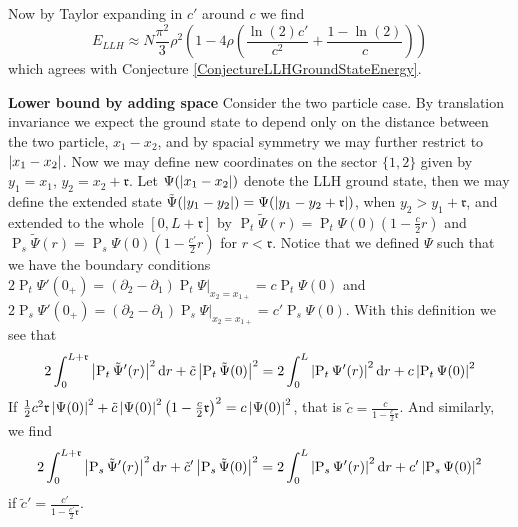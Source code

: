 Now by Taylor expanding in $ c' $ around $ c $ we find 
\begin{equation}
	E_{LLH}\approx N\frac{\pi^2}{3}\rho^2\left(1-4\rho\left(\frac{\ln(2)c'}{c^2}+\frac{1-\ln(2)}{c}\right)\right)
\end{equation}
which agrees with Conjecture \ref{ConjectureLLHGroundStateEnergy}.

\textbf{Lower bound by adding space}
Consider the two particle case. By translation invariance we expect the ground state to depend only on the distance between the two particle, $ x_1-x_2 $, and by spacial symmetry we may further restrict to $ \left\lvert x_1-x_2 \right\rvert $. Now we may define new coordinates on the sector $ \{1,2\} $ given by $ y_1=x_1 $, $ y_2=x_2+\mathfrak{r} $. Let $ \Psi(\left\lvert x_1-x_2 \right\rvert) $ denote the LLH ground state, then we may define the extended state $ \tilde{\Psi}(\left\lvert y_1-y_2 \right\rvert)=\Psi(\left\lvert y_1-y_2+\mathfrak{r} \right\rvert) $, when $ y_2>y_1+\mathfrak{r} $, and extended to the whole $ [0,L+\mathfrak{r}] $ by $ \operatorname{P}_t\tilde{\Psi}(r)=\operatorname{P}_t\Psi(0)\left(1-\frac{c}{2}r\right) $ and $ \operatorname{P}_s\tilde{\Psi}(r)=\operatorname{P}_s\Psi(0)\left(1-\frac{c'}{2}r\right) $ for $ r<\mathfrak{r} $. Notice that we defined $ \Psi $ such that we have the boundary conditions $ 2\operatorname{P}_t\Psi'(0_+)=(\partial_2-\partial_1)\operatorname{P}_t\Psi\vert_{x_2=x_{1+}}=c\operatorname{P}_t\Psi(0) $ and $ 2\operatorname{P}_s\Psi'(0_+)=(\partial_2-\partial_1)\operatorname{P}_s\Psi\vert_{x_2=x_{1+}}=c'\operatorname{P}_s\Psi(0) $. With this definition we see that \begin{equation}
2\int_{0}^{L+\mathfrak{r}}\left\lvert \operatorname{P}_{t}\tilde{\Psi}'(r) \right\rvert^2\mathop{}\!\mathrm{d} r+\tilde{c}\left\lvert \operatorname{P}_{t}\tilde{\Psi}(0) \right\rvert^2=2\int_{0}^{L}\left\lvert \operatorname{P}_{t}\Psi'(r) \right\rvert^2\mathop{}\!\mathrm{d} r+c\left\lvert \operatorname{P}_{t}\Psi(0) \right\rvert^2
\end{equation} 
If $  \frac{1}{2}c^2\mathfrak{r}\left\lvert \Psi(0) \right\rvert^2+\tilde{c}\left\lvert \Psi(0) \right\rvert^2\left(1-\frac{c}{2}\mathfrak{r}\right)^2=c\left\lvert \Psi(0) \right\rvert^2 $, that is $ \tilde{c}=\frac{c}{1-\frac{c}{2}\mathfrak{r}} $. And similarly, we find \begin{equation}
2\int_{0}^{L+\mathfrak{r}}\left\lvert \operatorname{P}_{s}\tilde{\Psi}'(r) \right\rvert^2\mathop{}\!\mathrm{d} r+\tilde{c}'\left\lvert \operatorname{P}_{s}\tilde{\Psi}(0) \right\rvert^2=2\int_{0}^{L}\left\lvert \operatorname{P}_{s}\Psi'(r) \right\rvert^2\mathop{}\!\mathrm{d} r+c'\left\lvert \operatorname{P}_{s}\Psi(0) \right\rvert^2
\end{equation}
if $ \tilde{c}'=\frac{c'}{1-\frac{c'}{2}\mathfrak{r}} $.
